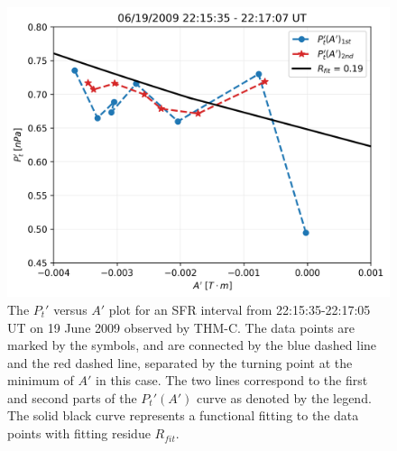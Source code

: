 
\begin{figure}
    \centering
    \includegraphics[width=\textwidth]{Figures/Reconstructions/PtvsA_20090619_20090621.png}
    \caption[$P_t'$ versus $A'$ plot for 22:15:35-22:17:05 UT on 19 June 2009]{The $P_t'$ versus $A'$ plot for an SFR interval from 22:15:35-22:17:05 UT on 19 June 2009 observed by THM-C. The data points are marked by the symbols, and are connected by the blue dashed line and the red dashed line, separated by the turning point at the minimum of $A'$ in this case. The two lines correspond to the first and second parts of the $P_t'(A')$ curve as denoted by the legend. The solid black curve represents a functional fitting to the data points with fitting residue $R_{fit}$.}
    \label{fig:Pt-vs-A}
\end{figure}


